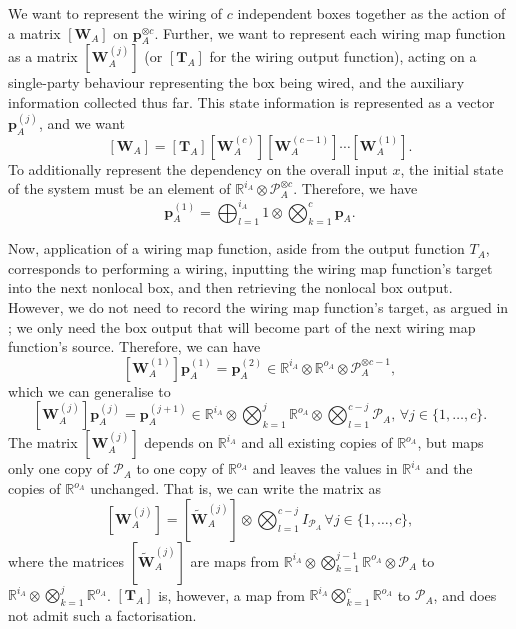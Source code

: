 \documentclass[10pt, a4paper]{article}
\numberwithin{equation}{section} %
\theoremstyle{definition}
\theoremstyle{plain}
\newcommand{\dintv}[2]{\mathopen\{#1,\ldots,#2\mathclose\}}
\newcommand{\?}{\mathrel{?}} %
\newcommand{\R}{\mathbb{R}} %
\newcommand{\cvec}[1]{\boldsymbol{\mathbf{#1}}}    %
\newcommand{\matr}[2][]{\left[\mathbf{#2}#1\right]} %
\newcommand{\sP}{\mathcal{P}}
\begin{document}
              We want to represent the wiring of \(c\) independent boxes together as the action of a matrix \(\matr[_A]{W}\) on \(\cvec{p}_A^{\otimes c}\). Further, we want to represent each wiring map function as a matrix \(\matr[_A^{(j)}]{W}\) (or \(\matr[_A]{T}\) for the wiring output function), acting on a single-party behaviour representing the box being wired, and the auxiliary information collected thus far. This state information is represented as a vector \(\cvec{p}^{(j)}_A\), and we want
              \[ \matr[_A]{W} = \matr[_A]{T} \matr[_A^{(c)}]{W} \matr[_A^{(c-1)}]{W} \cdots \matr[_A^{(1)}]{W}. \]
              To additionally represent the dependency on the overall input \(x\), the initial state of the system must be an element of \(\R^{i_A} \otimes \sP_A^{\otimes c}\). Therefore, we have
              \begin{equation}
                \cvec{p}_A^{(1)} = \bigoplus_{l=1}^{i_A} 1 \otimes \bigotimes_{k=1}^c \cvec{p}_A.
              \end{equation}

              Now, application of a wiring map function, aside from the output function \(T_A\), corresponds to performing a wiring, inputting the wiring map function's target into the next nonlocal box, and then retrieving the nonlocal box output. However, we do not need to record the wiring map function's target, as argued in ; we only need the box output that will become part of the next wiring map function's source. Therefore, we can have
              \[ \matr[_A^{(1)}]{W} \cvec{p}_A^{(1)} = \cvec{p}_A^{(2)} \in \R^{i_A} \otimes \R^{o_A} \otimes \sP_A^{\otimes c-1}, \]
              which we can generalise to
              \begin{equation}
                \matr[_A^{(j)}]{W} \cvec{p}_A^{(j)} = \cvec{p}_A^{(j+1)} \in \R^{i_A} \otimes \bigotimes_{k=1}^{j} \R^{o_A} \otimes \bigotimes_{l=1}^{c-j} \sP_A,\, \forall j \in \dintv{1}{c}.
              \end{equation}
              The matrix \(\matr[_A^{(j)}]{W}\) depends on \(\R^{i_A}\) and all existing copies of \(\R^{o_A}\), but maps only one copy of \(\sP_A\) to one copy of \(\R^{o_A}\) and leaves the values in \(\R^{i_A}\) and the copies of \(\R^{o_A}\) unchanged. That is, we can write the matrix as
              \begin{equation}
                \matr[_A^{(j)}]{W} = \matr[_A^{(j)}]{\tilde{W}} \otimes \bigotimes_{l=1}^{c-j} I_{\sP_A} \, \forall j \in \dintv{1}{c},
              \end{equation}
              where the matrices \(\matr[_A^{(j)}]{\tilde{W}}\) are maps from \(\R^{i_A} \otimes \bigotimes_{k=1}^{j-1} \R^{o_A} \otimes \sP_A\) to \(\R^{i_A} \otimes \bigotimes_{k=1}^{j} \R^{o_A}\). \(\matr[_A]{T}\) is, however, a map from \(\R^{i_A} \bigotimes_{k=1}^{c} \R^{o_A}\) to \(\sP_A\), and does not admit such a factorisation.
\end{document}
